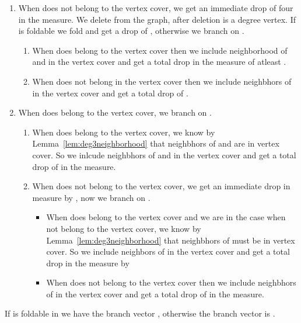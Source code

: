 \documentclass[svgnames]{llncs}
\begin{document}
{\begin{enumerate}[resume=scenarioC,label=\bfseries Case~\arabic*:]
\begin{enumerate}
\begin{enumerate}
 \item When  does not belong to the vertex cover, we get an immediate drop of four in the measure. We delete  from the graph, after deletion  is a degree  vertex. If  is foldable we fold  and get a drop of ,
 otherwise we branch on .
 \begin{enumerate}
  \item When  does belong to the vertex cover then we include neighborhood of  and  in the vertex cover and get a total drop in the measure of atleast .
  \item When  does not belong in the vertex cover then we include neighbhors of  in the vertex cover and get a total drop of .
 \end{enumerate}
\item When  does belong to the vertex cover, we branch on .
\begin{enumerate}
 \item When  does belong to the vertex cover, we know by Lemma~\ref{lem:deg3neighborhood} that neighbhors of  and  are in vertex cover. So we inlcude neighbhors of  and  in the vertex cover and get 
 a total drop of  in the measure.
 \item When  does not belong to the vertex cover, we get an immediate drop in measure by , now we branch on .
 \begin{itemize}
  \item When  does belong to the vertex cover and we are in the case when  not belong to the vertex cover, we know by Lemma~\ref{lem:deg3neighborhood} that neighbhors of  must be in vertex cover.
  So we include neighbors of  in the vertex cover and get a total drop in the measure by 
  \item When  does not belong to the vertex cover then we include neighbhors of  in the vertex cover and get a total drop of  in the measure.
 \end{itemize}
\end{enumerate}
\end{enumerate}

If  is foldable in  we have the branch vector , otherwise the branch vector is .
 \end{enumerate}










\end{enumerate}




}
\end{document}
